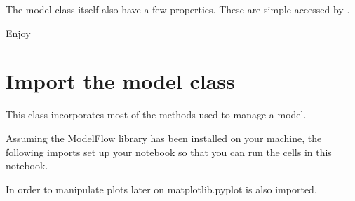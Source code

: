 \documentclass[letterpaper,10pt,english]{jupyterBook}
\begin{document}
\sphinxAtStartPar
The model class itself also have a few properties. These are simple accessed by  .

\sphinxAtStartPar
Enjoy


\section{Import the model class}
\label{\detokenize{content/notebooks/modelflow_features:import-the-model-class}}
\sphinxAtStartPar
This class incorporates most of the methods used to manage a model.

\sphinxAtStartPar
Assuming the ModelFlow library has been installed on your machine, the following imports set up your notebook so that you can run the cells in this notebook.

\sphinxAtStartPar
In order to manipulate plots later on matplotlib.pyplot is also imported.
\end{document}
